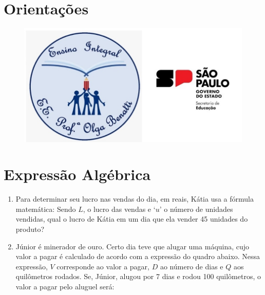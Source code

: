 \documentclass[a4paper, landscape]{article}
\begin{document}
	
	


	\fontsize{10}{15}\selectfont

	\vspace*{0mm}
	
	\begin{multicols}{2}
		
	\section*{Orientações}
		\begin{figure}[H]
		\begin{center}
			\includegraphics[keepaspectratio=true, scale=0.2]{pei.jpg}
		\end{center}
	\end{figure}
	
	\section*{Expressão Algébrica} 
				
	\begin{enumerate}
		\item Para determinar seu lucro nas vendas do dia, em reais, Kátia usa a fórmula matemática:  
		Sendo $L$, o lucro das vendas e $‘u’$ o número de unidades vendidas, qual o lucro de Kátia em um dia que ela vender 45 unidades do produto?
		
		\item Júnior é minerador de ouro. Certo dia teve que alugar uma máquina, cujo valor a pagar é calculado de acordo com a expressão do quadro abaixo. 
		Nessa expressão, $V$ corresponde ao valor a pagar, $D$ ao número de dias e $Q$ aos quilômetros rodados. Se, Júnior, alugou por 7 dias e rodou 100 quilômetros, o valor a pagar pelo aluguel será:
		

\end{enumerate}
\end{multicols}
\end{document}
